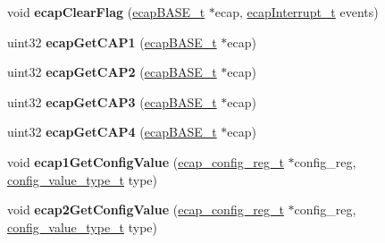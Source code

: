 \begin{DoxyCompactItemize}
\item 
\mbox{\label{group__eCAP_ga08b5c26770fe83ef44979850002e7f5b}} 
void {\bfseries ecap\+Clear\+Flag} (\mbox{\hyperlink{reg__ecap_8h_a8ca3ed15315b354b71b837ed4b6685a9}{ecap\+B\+A\+S\+E\+\_\+t}} $\ast$ecap, \mbox{\hyperlink{ecap_8h_a5432cd14eb279967751b607c755e8329}{ecap\+Interrupt\+\_\+t}} events)
\item 
\mbox{\label{group__eCAP_ga7461a0d3eaff2dbe071c34aa1f9395bf}} 
uint32 {\bfseries ecap\+Get\+C\+A\+P1} (\mbox{\hyperlink{reg__ecap_8h_a8ca3ed15315b354b71b837ed4b6685a9}{ecap\+B\+A\+S\+E\+\_\+t}} $\ast$ecap)
\item 
\mbox{\label{group__eCAP_ga15c8135d2951709db6916b824959d310}} 
uint32 {\bfseries ecap\+Get\+C\+A\+P2} (\mbox{\hyperlink{reg__ecap_8h_a8ca3ed15315b354b71b837ed4b6685a9}{ecap\+B\+A\+S\+E\+\_\+t}} $\ast$ecap)
\item 
\mbox{\label{group__eCAP_ga20c1a2c5f1884a32a3705efd85380b6a}} 
uint32 {\bfseries ecap\+Get\+C\+A\+P3} (\mbox{\hyperlink{reg__ecap_8h_a8ca3ed15315b354b71b837ed4b6685a9}{ecap\+B\+A\+S\+E\+\_\+t}} $\ast$ecap)
\item 
\mbox{\label{group__eCAP_gae482bc62942714d6a034456d94e49b54}} 
uint32 {\bfseries ecap\+Get\+C\+A\+P4} (\mbox{\hyperlink{reg__ecap_8h_a8ca3ed15315b354b71b837ed4b6685a9}{ecap\+B\+A\+S\+E\+\_\+t}} $\ast$ecap)
\item 
\mbox{\label{group__eCAP_ga6a2ddfd5bb3e220330ba4f7abdcec88f}} 
void {\bfseries ecap1\+Get\+Config\+Value} (\mbox{\hyperlink{structecap__config__reg}{ecap\+\_\+config\+\_\+reg\+\_\+t}} $\ast$config\+\_\+reg, \mbox{\hyperlink{sys__common_8h_a9daf9a5992391b058477d28d107ee5e2}{config\+\_\+value\+\_\+type\+\_\+t}} type)
\item 
\mbox{\label{group__eCAP_ga641254f9bc5ac9ccb786d50b5da9f84b}} 
void {\bfseries ecap2\+Get\+Config\+Value} (\mbox{\hyperlink{structecap__config__reg}{ecap\+\_\+config\+\_\+reg\+\_\+t}} $\ast$config\+\_\+reg, \mbox{\hyperlink{sys__common_8h_a9daf9a5992391b058477d28d107ee5e2}{config\+\_\+value\+\_\+type\+\_\+t}} type)
\item 
\mbox{\label{group__eCAP_ga24637a991e299aa737bd5d6e269585f6}} 

\end{DoxyCompactItemize}
